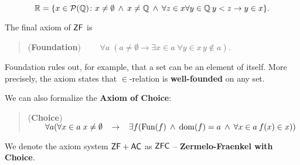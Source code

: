 \begin{equation}
\mathbb{R} = \{ x \in \mathcal{P}(\mathbb{Q}) \colon x \neq \emptyset \: \wedge \: x \neq \mathbb{Q} \: \wedge \: \forall z \in x \forall y \in \mathbb{Q} \: y < z \to y \in x \}.
\end{equation}

The final axiom of $\mathsf{ZF}$ is

\begin{quote}
(\textbf{Foundation}) $\qquad \forall a \;( a \neq \emptyset \to \exists x \in a \; \forall y \in x \, y \not \in a)$.
\end{quote}

Foundation rules out, for example, that a set can be an element of itself. More precisely, the axiom states that $\in$-relation is \textbf{well-founded} on any set.

We can also formalize the \textbf{Axiom of Choice}:

\begin{quote}
(\textbf{Choice}) $\qquad \forall a ( \forall x \in a \; x \neq \emptyset \;\;\; \to \;\;\; \exists f (\operatorname{Fun}(f) \:\wedge\: \operatorname{dom}(f) = a \:\wedge\: \forall x \in a \: f(x) \in x))$
\end{quote}

We denote the axiom system $\mathsf{ZF} + \mathsf{AC}$ as $\mathsf{ZFC}$ -- \textbf{Zermelo-Fraenkel with Choice}.